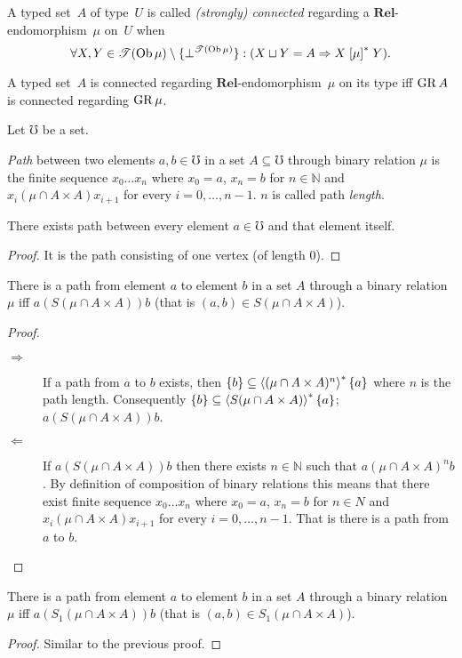 \begin{defn}
A typed set~$A$ of type~$U$ is called \emph{(strongly) connected}
regarding a $\mathbf{Rel}$-endomorphism~$\mu$ on~$U$ when
\[
\forall X,Y\in\mathscr{T}(\operatorname{Ob}\mu)\setminus\{\bot^{\mathscr{T}(\operatorname{Ob}\mu)}\}:(X\sqcup Y=A\Rightarrow X\mathrel{\left[\mu\right]^{\ast}}Y).
\]
\end{defn}
\begin{obvious}
A typed set~$A$ is connected regarding $\mathbf{Rel}$-endomorphism~$\mu$
on its type iff $\operatorname{GR} A$ is connected regarding $\operatorname{GR}\mu$.
\end{obvious}
Let $\mho$ be a set.
\begin{defn}
\emph{Path} between two elements $a,b\in\mho$ in a set
$A\subseteq\mho$ through binary relation $\mu$ is the finite sequence
$x_{0}\ldots x_{n}$ where $x_{0}=a$, $x_{n}=b$ for $n\in\mathbb{N}$
and $x_{i}\mathrel{(\mu\cap A\times A)}x_{i+1}$ for every $i=0,\ldots,n-1$.
$n$ is called path \emph{length}.\end{defn}
\begin{prop}
There exists path between every element $a\in\mho$ and that element
itself.\end{prop}
\begin{proof}
It is the path consisting of one vertex (of length $0$).\end{proof}
\begin{prop}
There is a path from element $a$ to element $b$ in a set $A$ through
a binary relation $\mu$ iff $a\mathrel{(S(\mu\cap A\times A))}b$
(that is $(a,b)\in S(\mu\cap A\times A)$).\end{prop}
\begin{proof}
~
\begin{description}
\item [{$\Rightarrow$}] If a path from $a$ to $b$ exists, then $\{b\}\subseteq\left\langle (\mu\cap A\times A)^{n}\right\rangle ^{\ast}\{a\}$
where $n$ is the path length. Consequently $\{b\}\subseteq\left\langle S(\mu\cap A\times A)\right\rangle ^{\ast}\{a\}$;
$a\mathrel{(S(\mu\cap A\times A))}b$.
\item [{$\Leftarrow$}] If $a\mathrel{(S(\mu\cap A\times A))}b$ then there
exists $n\in\mathbb{N}$ such that $a\mathrel{(\mu\cap A\times A)^{n}}b$.
By definition of composition of binary relations this means that there
exist finite sequence $x_{0}\ldots x_{n}$ where $x_{0}=a$, $x_{n}=b$
for $n\in\mathbb{}{N}$ and $x_{i}\mathrel{(\mu\cap A\times A)}x_{i+1}$
for every $i=0,\ldots,n-1$. That is there is a path from $a$ to
$b$.
\end{description}
\end{proof}
\begin{prop}
There is a path from element $a$ to element $b$ in a set $A$ through
a binary relation $\mu$ iff $a\mathrel{(S_1(\mu\cap A\times A))}b$
(that is $(a,b)\in S_1(\mu\cap A\times A)$).\end{prop}
\begin{proof}
Similar to the previous proof.
\end{proof}

